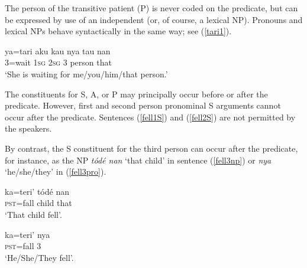 \documentclass[output=paper
,modfonts
,nonflat]{langsci/langscibook}
\begin{document}
\z

\noindent The person of the transitive patient (P) is never coded on the predicate, but can be expressed by use of an independent  (or, of course, a lexical NP). Pronouns and lexical NPs behave syntactically in the same way; see (\ref{tari1}).

\ea\label{tari1}
\gll ya=tari	aku {\USSlash} kau {\USSlash} nya {\USSlash} tau	 nan\\
3=wait \textsc{1sg} {} \textsc{2sg} {} 3 {} person that\\
\glt `She is waiting for me/you/him/that person.'
\z

\noindent The constituents for S, A, or P may principally occur before or after the predicate. However, first and second person pronominal S arguments cannot occur after the predicate. Sentences (\ref{fell1S}) and (\ref{fell2S}) are not permitted by the speakers.

\begin{multicols}{2}
	\z
	
	\z
\end{multicols}

\noindent By contrast, the S constituent for the third person can occur after the predicate, for instance, as the NP \textit{t\'od\'e nan} `that child' in sentence (\ref{fell3np}) or \textit{nya} `he/she/they' in (\ref{fell3pro}).

\begin{multicols}{2}
	\ea\label{fell3np}
	\gll ka=teri’	t\'od\'e	nan\\
	\textsc{pst}=fall	child	that\\
	\glt `That child fell’.
	\z
	
	\ea\label{fell3pro}
	\gll ka=teri'	nya\\
	\textsc{pst}=fall	3\\
	\glt `He/She/They fell’. 
	\z
\end{multicols}
\end{document}
